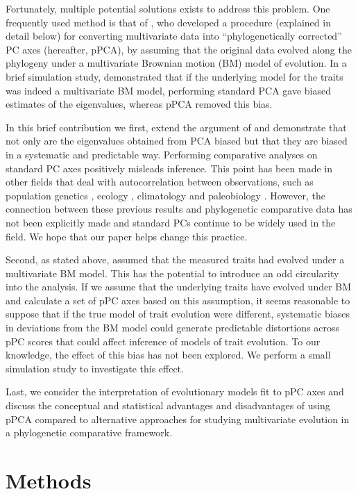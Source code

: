 \documentclass[a4paper,12pt]{article}
\begin{document}
Fortunately, multiple potential solutions exists to address this problem.  One frequently used method is that of \citet{Revell2008}, who developed a procedure (explained in detail below) for converting multivariate data into ``phylogenetically corrected'' PC axes (hereafter, pPCA), by assuming that the original data evolved along the phylogeny under a multivariate Brownian motion (BM) model of evolution. In a brief simulation study, \citet{Revell2008} demonstrated that if the underlying model for the traits was indeed a multivariate BM model, performing standard PCA gave biased estimates of the eigenvalues, whereas pPCA removed this bias.

In this brief contribution we first, extend the argument of \citet{Revell2008} and demonstrate that not only are the eigenvalues obtained from PCA biased but that they are biased in a systematic and predictable way. Performing comparative analyses on standard PC axes positively misleads inference. This point has been made in other fields that deal with autocorrelation between observations, such as population genetics \citep{Novembre}, ecology \citep{Podani2002}, climatology \citep{Richman1986} and paleobiology \citep{Bookstein2012}. However, the connection between these previous results and phylogenetic comparative data has not been explicitly made and standard PCs continue to be widely used in the field. We hope that our paper helps change this practice.

Second, as stated above, \citet{Revell2008} assumed that the measured traits had evolved under a multivariate BM model. This has the potential to introduce an odd circularity into the analysis. If we assume that the underlying traits have evolved under BM and calculate a set of pPC axes based on this assumption, it seems reasonable to suppose that if the true model of trait evolution were different, systematic biases in deviations from the BM model could generate predictable distortions across pPC scores that could affect inference of models of trait evolution. To our knowledge, the effect of this bias has not been explored. We perform a small simulation study to investigate this effect.

Last, we consider the interpretation of evolutionary models fit to pPC axes and discuss the conceptual and statistical advantages and disadvantages of using pPCA compared to alternative approaches for studying multivariate evolution in a phylogenetic comparative framework.

\section{Methods}
\end{document}

